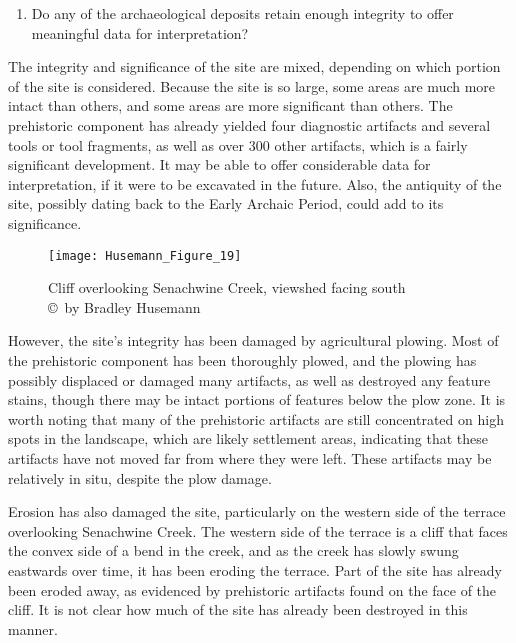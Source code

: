 \begin{enumerate}[resume]
	\item Do any of the archaeological deposits retain enough integrity to offer meaningful data for interpretation?
\end{enumerate}

The integrity and significance of the site are mixed, depending on which portion of the site is considered. Because the site is so large, some areas are much more intact than others, and some areas are more significant than others.
The prehistoric component has already yielded four diagnostic artifacts and several tools or tool fragments, as well as over 300 other artifacts, which is a fairly significant development. It may be able to offer considerable data for interpretation, if it were to be excavated in the future. Also, the antiquity of the site, possibly dating back to the Early Archaic Period, could add to its significance.


\begin{wrapfigure}{O}[3cm]{0.5\textwidth}
	\texttt{[image: Husemann\_Figure\_19]}
	\caption{Cliff overlooking Senachwine Creek, viewshed facing south
		{\normalfont\scriptsize \\ \copyright\ by Bradley Husemann
	}}
	\label{fig:Husemann_Figure_19}
\end{wrapfigure}
However, the site’s integrity has been damaged by agricultural plowing. Most of the prehistoric component has been thoroughly plowed, and the plowing has possibly displaced or damaged many artifacts, as well as destroyed any feature stains, though there may be intact portions of features below the plow zone. It is worth noting that many of the prehistoric artifacts are still concentrated on high spots in the landscape, which are likely settlement areas, indicating that these artifacts have not moved far from where they were left. These artifacts may be relatively in situ, despite the plow damage.

Erosion has also damaged the site, particularly on the western side of the terrace overlooking Senachwine Creek. The western side of the terrace is a cliff that faces the convex side of a bend in the creek, and as the creek has slowly swung eastwards over time, it has been eroding the terrace. Part of the site has already been eroded away, as evidenced by prehistoric artifacts found on the face of the cliff. It is not clear how much of the site has already been destroyed in this manner.

